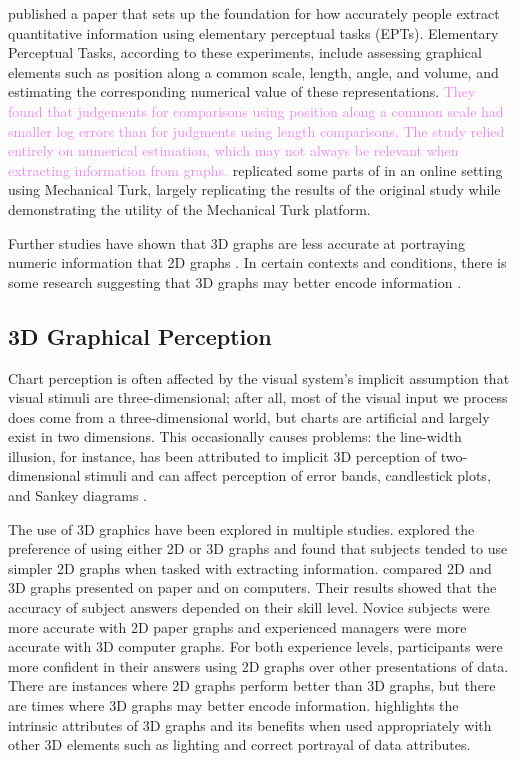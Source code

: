 \documentclass[letterpaper,inpress,dvipsnames]{jdsart}
\begin{document}
\citet{cleveland_graphical_1984} published a paper that sets up the foundation for how accurately people extract quantitative information using elementary perceptual tasks (EPTs).
Elementary Perceptual Tasks, according to these experiments, include assessing graphical elements such as position along a common scale, length, angle, and volume, and estimating the corresponding numerical value of these representations.
{\textcolor{Violet}{They found that judgements for comparisons using position along a common scale had smaller log errors than for judgments using length comparisons. The study relied entirely on numerical estimation, which may not always be relevant when extracting information from graphs.}}
\citet{heerCrowdsourcingGraphicalPerception2010b} replicated some parts of \citet{cleveland_graphical_1984} in an online setting using Mechanical Turk, largely replicating the results of the original study while demonstrating the utility of the Mechanical Turk platform.

Further studies have shown that 3D graphs are less accurate at portraying numeric information that 2D graphs \citep{barfield_effects_1989, fisher_data_1997}. In certain contexts and conditions, there is some research suggesting that 3D graphs may better encode information \citep{brath_3d_2014}.

\hypertarget{d-graphical-perception}{%
\subsection{3D Graphical Perception}\label{d-graphical-perception}}

Chart perception is often affected by the visual system's implicit assumption that visual stimuli are three-dimensional; after all, most of the visual input we process does come from a three-dimensional world, but charts are artificial and largely exist in two dimensions.
This occasionally causes problems: the line-width illusion, for instance, has been attributed to implicit 3D perception of two-dimensional stimuli and can affect perception of error bands, candlestick plots, and Sankey diagrams \citep{vanderplasSignsSineIllusion2015, daySineIllusion1991, hofmannCommonAnglePlots2013}.

The use of 3D graphics have been explored in multiple studies.
\citet{fisher_data_1997} explored the preference of using either 2D or 3D graphs and found that subjects tended to use simpler 2D graphs when tasked with extracting information. \citet{barfield_effects_1989} compared 2D and 3D graphs presented on paper and on computers.
Their results showed that the accuracy of subject answers depended on their skill level.
Novice subjects were more accurate with 2D paper graphs and experienced managers were more accurate with 3D computer graphs.
For both experience levels, participants were more confident in their answers using 2D graphs over other presentations of data.
There are instances where 2D graphs perform better than 3D graphs, but there are times where 3D graphs may better encode information.
\citet{brath_3d_2014} highlights the intrinsic attributes of 3D graphs and its benefits when used appropriately with other 3D elements such as lighting and correct portrayal of data attributes.
\end{document}
